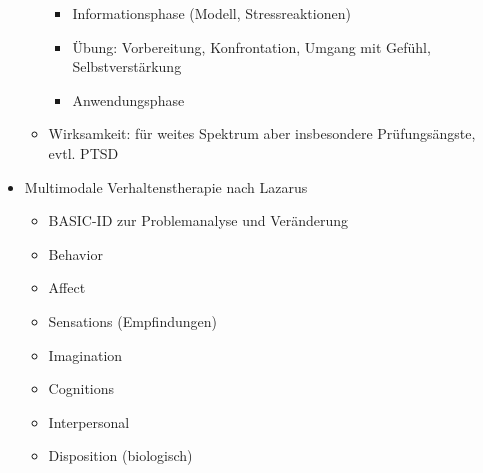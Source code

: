 \documentclass[11pt, paper=a4, twocolumn]{scrartcl}
\begin{document}
\begin{itemize}
\begin{itemize}
						\begin{itemize}
							\item Informationsphase (Modell, Stressreaktionen)
							\item Übung: Vorbereitung, Konfrontation, Umgang mit Gefühl, Selbstverstärkung
							\item Anwendungsphase
						\end{itemize}
					\item Wirksamkeit: für weites Spektrum aber insbesondere Prüfungsängste, evtl. PTSD
				\end{itemize}
			\item Multimodale Verhaltenstherapie nach Lazarus
				\begin{itemize}
					\item BASIC-ID zur Problemanalyse und Veränderung
					\item Behavior
					\item Affect
					\item Sensations (Empfindungen)
					\item Imagination
					\item Cognitions
					\item Interpersonal
					\item Disposition (biologisch)
				\end{itemize}
		\end{itemize}
\end{document}
